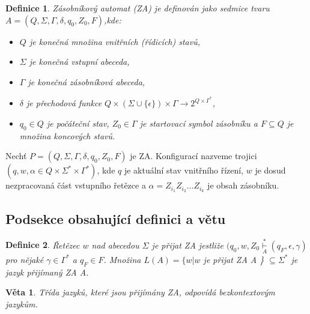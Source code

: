 \documentclass[a4paper, twocolumn, 11pt]{article}
\newtheorem{definice}{Definice}
\newtheorem{veta}{Věta}
\begin{document}
\label{definicia}
\begin{definice}
\emph{Zásobníkový automat} (ZA) je definován jako sedmice tvaru $A =(Q,\Sigma,\Gamma,\delta,q_0,Z_0,F)$,kde: 
\begin{itemize}
        \item $Q$ je konečná množina \emph{vnitřních (řídicích) stavů,} 
        \item $\Sigma$ je konečná \emph{vstupní abeceda}, 
        \item $\Gamma$ je konečná \emph{zásobníková abeceda}, 
        \item $\delta$ je \emph{přechodová funkce} $Q \times (\Sigma \cup \{\epsilon\}) \times \Gamma \rightarrow 2^{Q \times \Gamma^*}$,
        \item $q_0 \in Q$ je počáteční stav, $Z_0 \in \Gamma$ je startovací symbol zásobníku a $F \subseteq Q$ je množina koncových stavů. 
\end{itemize}
\end{definice}

Nechť $P =(Q,\Sigma,\Gamma,\delta,q_0,Z_0,F)$ je ZA. Konfigurací nazveme trojici $(q, w, \alpha \in Q \times \Sigma^* \times \Gamma^*)$, kde $q$ je aktuální stav vnitřního řízení, $w$ je dosud nezpracovaná část vstupního řetězce a $\alpha = Z_{i_1}Z_{i_2} \dots Z_{i_k}$ je obsah zásobníku.

\subsection{Podsekce obsahující definici a větu}
\begin{definice}
\emph{Řetězec} $w$ \emph{nad abecedou} $\Sigma$ \emph{je přijat ZA} jestliže $(q_0, w, Z_0 \overset{\ast}{\underset{A}{\vdash}} (q_F,\epsilon, \gamma)$ pro nějaké $\gamma \in \Gamma^*$ a $q_F \in F$. Množina $L(A) = \{ w | w $ je přijat ZA A \} $\subseteq \Sigma^*$ je \emph{jazyk přijímaný ZA} A.
\end{definice}
\begin{veta}
Třída jazyků, které jsou přijímány ZA, odpovídá \emph{bezkontextovým jazykům.}
\end{veta}
\end{document}
